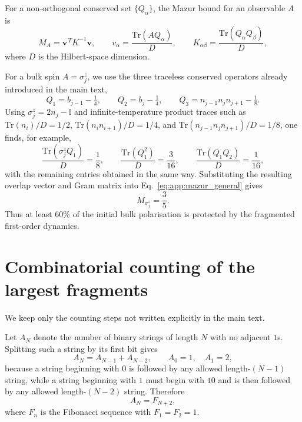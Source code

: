 \documentclass[aps,prb,reprint,twocolumn,amsmath,amssymb,citeautoscript]{revtex4-2}
\begin{document}
For a non-orthogonal conserved set \(\{Q_\alpha\}\), the Mazur bound for an observable \(A\) is
\begin{equation}
M_A=\mathbf{v}^{\,T}K^{-1}\mathbf{v},
\qquad
v_\alpha=\frac{\mathrm{Tr}(A Q_\alpha)}{D},
\qquad
K_{\alpha\beta}=\frac{\mathrm{Tr}(Q_\alpha Q_\beta)}{D},
\label{eq:app:mazur_general}
\end{equation}
where \(D\) is the Hilbert-space dimension.

For a bulk spin \(A=\sigma_j^z\), we use the three traceless conserved operators already introduced in the main text,
\begin{equation}
Q_1=b_{j-1}-\tfrac14,\qquad
Q_2=b_j-\tfrac14,\qquad
Q_3=n_{j-1}n_jn_{j+1}-\tfrac18.
\label{eq:app:Qbasis}
\end{equation}
Using
\(
\sigma_j^z=2n_j-\mathbb{I}
\)
and infinite-temperature product traces such as
\(
\mathrm{Tr}(n_i)/D=1/2
\),
\(
\mathrm{Tr}(n_in_{i+1})/D=1/4
\),
and
\(
\mathrm{Tr}(n_{j-1}n_jn_{j+1})/D=1/8
\),
one finds, for example,
\begin{equation}
\frac{\mathrm{Tr}(\sigma_j^z Q_1)}{D}=\frac18,
\qquad
\frac{\mathrm{Tr}(Q_1^2)}{D}=\frac{3}{16},
\qquad
\frac{\mathrm{Tr}(Q_1Q_2)}{D}=\frac{1}{16},
\label{eq:app:mazur_samples}
\end{equation}
with the remaining entries obtained in the same way. Substituting the resulting overlap vector and Gram matrix into Eq.~\eqref{eq:app:mazur_general} gives
\begin{equation}
M_{\sigma_j^z}=\frac35.
\label{eq:app:mazur_final}
\end{equation}
Thus at least \(60\%\) of the initial bulk polarisation is protected by the fragmented first-order dynamics.
\section{Combinatorial counting of the largest fragments}
\label{app:fibonacci}

We keep only the counting steps not written explicitly in the main text.

Let \(A_N\) denote the number of binary strings of length \(N\) with no adjacent \(1\)s. Splitting such a string by its first bit gives
\begin{equation}
A_N=A_{N-1}+A_{N-2},\qquad A_0=1,\quad A_1=2,
\label{eq:app:ANrec}
\end{equation}
because a string beginning with \(0\) is followed by any allowed length-\((N-1)\) string, while a string beginning with \(1\) must begin with \(10\) and is then followed by any allowed length-\((N-2)\) string. Therefore
\begin{equation}
A_N=F_{N+2},
\label{eq:app:ANfib}
\end{equation}
where \(F_n\) is the Fibonacci sequence with \(F_1=F_2=1\).
\end{document}
